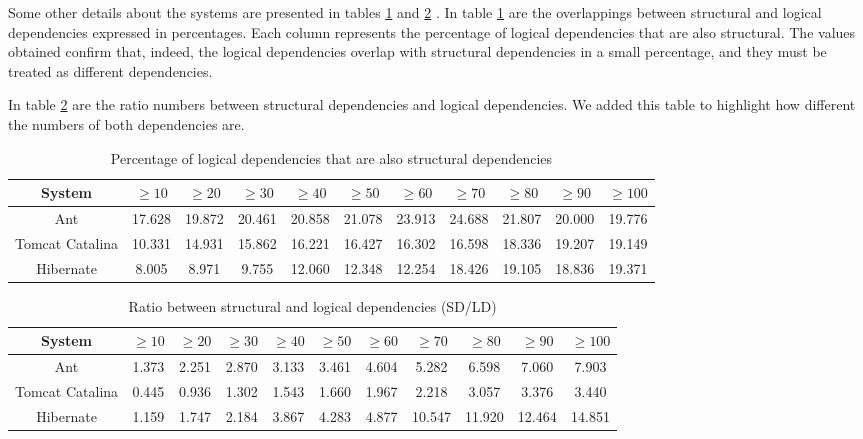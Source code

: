 \documentclass[runningheads]{comsis2}
\begin{document}
Some other details about the systems are presented in tables \ref{tab:overlap} and \ref{tab:ratio_sd_ld} . In table \ref{tab:overlap} are the overlappings between structural and logical dependencies expressed in percentages. Each column represents the percentage of logical dependencies that are also structural. 
The values obtained confirm that, indeed, the logical dependencies overlap with structural dependencies in a small percentage, and they must be treated as different dependencies.

In table \ref{tab:ratio_sd_ld} are the ratio numbers between structural dependencies and logical dependencies. We added this table to highlight how different the numbers of both dependencies are.


\begin{table}[!h]
\setlength\tabcolsep{3pt}
\caption{Percentage of logical dependencies that are also structural dependencies}
\label{tab:overlap}
\centering
\begin{tabular}{|c|cccccccccc|}
\hline
System &	$\geq10$	&	$\geq20$		&	$\geq30$		&	$\geq40$		&	$\geq50$		&	$\geq60$		&	$\geq70$		&	$\geq80$		&	$\geq90$		&	$\geq100$ \\
\hline
Ant	&	17.628	&	19.872	&	20.461	&	20.858	&	21.078	&	23.913	&	24.688	&	21.807	&	20.000	&	19.776	\\
Tomcat Catalina  	&	10.331	&	14.931	&	15.862	&	16.221	&	16.427	&	16.302	&	16.598	&	18.336	&	19.207	&	19.149	\\
Hibernate	&	8.005	&	8.971	&	9.755	&	12.060	&	12.348	&	12.254	&	18.426	&	19.105	&	18.836	&	19.371	\\
\hline
\end{tabular}
\end{table}



\begin{table}[!h]
\setlength\tabcolsep{3.5pt}
\caption{Ratio between structural and logical dependencies (SD/LD)}
\label{tab:ratio_sd_ld}
\centering
\begin{tabular}{|c|cccccccccc|}
\hline
System &	$\geq10$	&	$\geq20$		&	$\geq30$		&	$\geq40$		&	$\geq50$		&	$\geq60$		&	$\geq70$		&	$\geq80$		&	$\geq90$		&	$\geq100$ \\

\hline
Ant	&	1.373	&	2.251	&	2.870	&	3.133	&	3.461	&	4.604	&	5.282	&	6.598	&	7.060	&	7.903	\\
Tomcat Catalina	&	0.445	&	0.936	&	1.302	&	1.543	&	1.660	&	1.967	&	2.218	&	3.057	&	3.376	&	3.440	\\
Hibernate	&	1.159	&	1.747	&	2.184	&	3.867	&	4.283	&	4.877	&	10.547	&	11.920	&	12.464	&	14.851	\\

\hline
\end{tabular}
\end{table}
\end{document}
